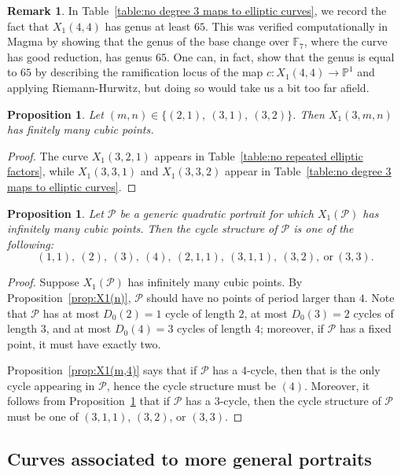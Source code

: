 \documentclass[12pt]{amsart}
\newtheorem{prop}[thm]{Proposition}
\theoremstyle{definition}
\newtheorem{rem}[thm]{Remark}
\newcommand{\bbF}{\mathbb{F}}
\newcommand{\bbP}{\mathbb{P}}
\newcommand{\calP}{\mathcal{P}}
\numberwithin{equation}{section}
\begin{document}
\begin{rem}
    In Table~\ref{table:no degree 3 maps to elliptic curves}, we record the fact that $X_1(4,4)$ has genus at least $65$. This was verified computationally in Magma by showing that the genus of the base change over $\bbF_7$, where the curve has good reduction, has genus $65$. One can, in fact, show that the genus is equal to $65$ by describing the ramification locus of the map $c : X_1(4,4) \to \bbP^1$ and applying Riemann-Hurwitz, but doing so would take us a bit too far afield.
\end{rem}

\begin{prop}\label{prop:X1(m,n,3)}
    Let $(m,n) \in \{(2,1),\ (3,1),\ (3,2)\}$. Then $X_1(3,m,n)$ has finitely many cubic points.
\end{prop}

\begin{proof}
    The curve $X_1(3,2,1)$ appears in Table~\ref{table:no repeated elliptic factors}, while $X_1(3,3,1)$ and $X_1(3,3,2)$ appear in Table~\ref{table:no degree 3 maps to elliptic curves}.
\end{proof}

\begin{prop}\label{prop:cycle_structures}
    Let $\calP$ be a generic quadratic portrait for which $X_1(\calP)$ has infinitely many cubic points. Then the cycle structure of $\calP$ is one of the following:
        \[
            (1,1),\ (2),\ (3),\ (4),\ (2,1,1),\ (3,1,1),\ (3,2),\ \text{or}\ (3,3).
        \]
\end{prop}

\begin{proof}
Suppose $X_1(\calP)$ has infinitely many cubic points. By Proposition~\ref{prop:X1(n)}, $\calP$ should have no points of period larger than $4$. Note that $\calP$ has at most $D_0(2) = 1$ cycle of length $2$, at most $D_0(3) = 2$ cycles of length $3$, and at most $D_0(4) = 3$ cycles of length $4$; moreover, if $\calP$ has a fixed point, it must have exactly two.

Proposition~\ref{prop:X1(m,4)} says that if $\calP$ has a $4$-cycle, then that is the only cycle appearing in $\calP$, hence the cycle structure must be $(4)$. Moreover, it follows from Proposition~\ref{prop:X1(m,n,3)} that if $\calP$ has a $3$-cycle, then the cycle structure of $\calP$ must be one of $(3,1,1)$, $(3,2)$, or $(3,3)$.
\end{proof}

\subsection{Curves associated to more general portraits}\label{sec:finitely_many}
\end{document}
